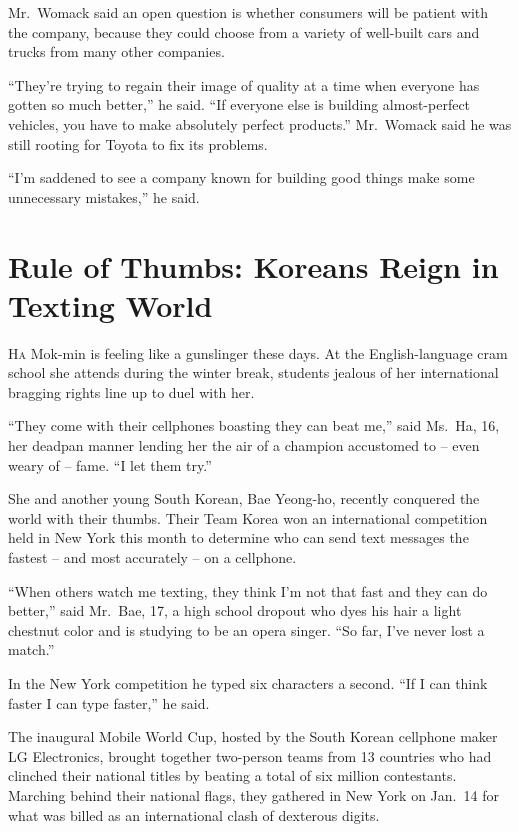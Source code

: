 ﻿\documentclass[12pt]{article}
\begin{document}
Mr.~Womack said an open question is whether consumers will be patient with the company, because they
could choose from a variety of well-built cars and trucks from many other companies.

``They're trying to regain their image of quality at a time when everyone has gotten so much
better,'' he said. ``If everyone else is building almost-perfect vehicles, you have to make
absolutely perfect products.'' Mr.~Womack said he was still rooting for Toyota to fix its problems.

``I'm saddened to see a company known for building good things make some unnecessary mistakes,'' he
said.

\section{Rule of Thumbs: Koreans Reign in Texting World}

\lettrine{H}{a} Mok-min is feeling like a gunslinger these days. At the
English-language cram school she attends during the winter break, students jealous of her
international bragging rights line up to duel with her.


``They come with their cellphones boasting they can beat me,'' said Ms.~Ha, 16, her deadpan manner
lending her the air of a champion accustomed to -- even weary of -- fame. ``I let them try.''

She and another young South Korean, Bae Yeong-ho, recently conquered the world with their thumbs.
Their Team Korea won an international competition held in New York this month to determine who can
send text messages the fastest -- and most accurately -- on a cellphone.

``When others watch me texting, they think I'm not that fast and they can do better,'' said Mr.~Bae,
17, a high school dropout who dyes his hair a light chestnut color and is studying to be an opera
singer. ``So far, I've never lost a match.''

In the New York competition he typed six characters a second. ``If I can think faster I can type
faster,'' he said.

The inaugural Mobile World Cup, hosted by the South Korean cellphone maker LG Electronics, brought
together two-person teams from 13 countries who had clinched their national titles by beating a
total of six million contestants. Marching behind their national flags, they gathered in New York on
Jan.~14 for what was billed as an international clash of dexterous digits.
\end{document}
